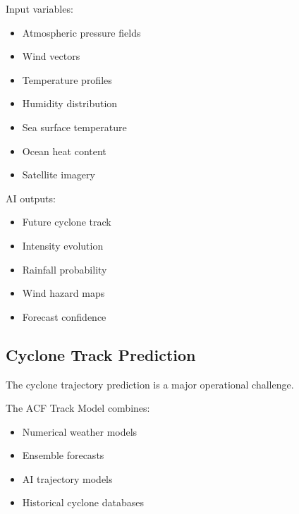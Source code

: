 Input variables:

\begin{itemize}

\item Atmospheric pressure fields

\item Wind vectors

\item Temperature profiles

\item Humidity distribution

\item Sea surface temperature

\item Ocean heat content

\item Satellite imagery

\end{itemize}


AI outputs:

\begin{itemize}

\item Future cyclone track

\item Intensity evolution

\item Rainfall probability

\item Wind hazard maps

\item Forecast confidence

\end{itemize}



\subsection{Cyclone Track Prediction}

The cyclone trajectory prediction is a major operational challenge.

The ACF Track Model combines:

\begin{itemize}

\item Numerical weather models

\item Ensemble forecasts

\item AI trajectory models

\item Historical cyclone databases

\end{itemize}


